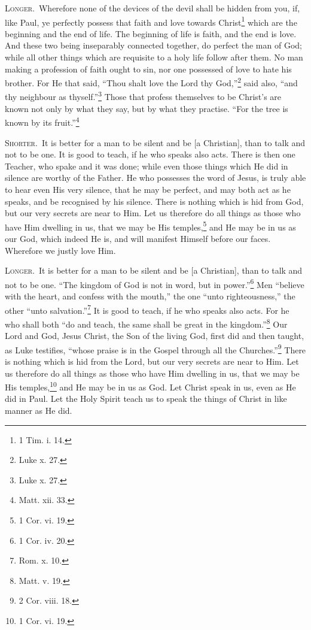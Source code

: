 \textsc{Longer.}~Wherefore none of the devices of the devil shall be hidden from you, if, like Paul, ye perfectly possess that faith and love towards Christ\footnote{1 Tim. i. 14.} which are the beginning and the end of life. The beginning of life is faith, and the end is love. And these two being inseparably connected together, do perfect the man of God; while all other things which are requisite to a holy life follow after them. No man making a profession of faith ought to sin, nor one possessed of love to hate his brother. For He that said, “Thou shalt love the Lord thy God,”\footnote{Luke x. 27.} said also, “and thy neighbour as thyself.”\footnote{Luke x. 27.} Those that profess themselves to be Christ’s are known not only by what they say, but by what they practise. “For the tree is known by its fruit.”\footnote{Matt. xii. 33.}


\textsc{Shorter.}~It is better for a man to be silent and be [a Christian], than to talk and not to be one. It is good to teach, if he who speaks also acts. There is then one Teacher, who spake and it was done; while even those things which He did in silence are worthy of  the Father. He who possesses the word of Jesus, is truly able to hear even His very silence, that he may be perfect, and may both act as he speaks, and be recognised by his silence. There is nothing which is hid from God, but our very secrets are near to Him. Let us therefore do all things as those who have Him dwelling in us, that we may be His temples,\footnote{1 Cor. vi. 19.} and He may be in us as our God, which indeed He is, and will manifest Himself before our faces. Wherefore we justly love Him.

\textsc{Longer.}~It is better for a man to be silent and be [a Christian], than to talk and not to be one. “The kingdom of God is not in word, but in power.”\footnote{1 Cor. iv. 20.} Men “believe with the heart, and confess with the mouth,” the one “unto righteousness,” the other “unto salvation.”\footnote{Rom. x. 10.} It is good to teach, if he who speaks also acts. For he who shall both “do and teach, the same shall be great in the kingdom.”\footnote{Matt. v. 19.} Our Lord and God, Jesus Christ, the Son of the living God, first did and then taught, as Luke testifies, “whose praise is in the Gospel through all the Churches.”\footnote{2 Cor. viii. 18.} There is nothing which is hid from the Lord, but our very secrets are near to Him. Let us therefore do all things as those who have Him dwelling in us, that we may be His temples,\footnote{1 Cor. vi. 19.} and He may be in us as God. Let Christ speak in us, even as He did in Paul. Let the Holy Spirit teach us to speak the things of Christ in like manner as He did.

